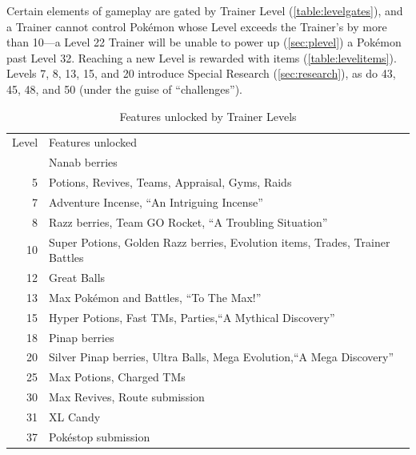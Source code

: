 Certain elements of gameplay are gated by Trainer Level (\autoref{table:levelgates}),
  and a Trainer cannot control Pokémon whose Level exceeds the Trainer's
  by more than 10---a Level 22 Trainer will be unable to power up (\autoref{sec:plevel}) a Pokémon past Level 32.
Reaching a new Level is rewarded with items (\autoref{table:levelitems}).
Levels 7, 8, 13, 15, and 20 introduce Special Research (\autoref{sec:research}), as do
 43, 45, 48, and 50 (under the guise of ``challenges'').
\begin{table}
  \centering
  \begin{tabular}{r p{}}
  Level & Features unlocked \\
\Midrule
  2 & Nanab berries \\
  5 & Potions, Revives, Teams, Appraisal, Gyms, Raids \\
  7 & Adventure Incense, ``An Intriguing Incense''\\
  8 & Razz berries, Team GO Rocket, ``A Troubling Situation'' \\
  10 & Super Potions, Golden Razz berries, Evolution items, Trades, Trainer Battles \\
  12 & Great Balls \\
  13 & Max Pokémon and Battles, ``To The Max!''\\
  15 & Hyper Potions, Fast TMs, Parties,\newline``A Mythical Discovery'' \\
  18 & Pinap berries \\
  20 & Silver Pinap berries, Ultra Balls, Mega Evolution,\newline``A Mega Discovery'' \\
  25 & Max Potions, Charged TMs \\
  30 & Max Revives, Route submission \\
  31 & XL Candy \\
  37 & Pokéstop submission \\
\end{tabular}
  \caption{Features unlocked by Trainer Levels\label{table:levelgates}}
\end{table}
